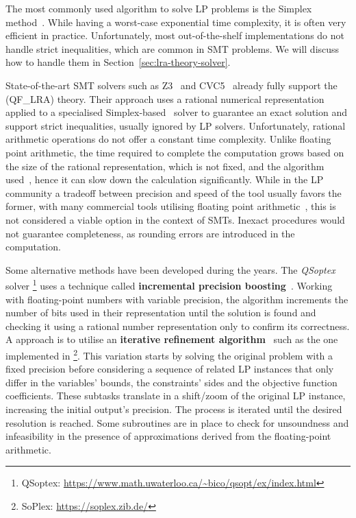 \documentclass[runningheads]{llncs}
\begin{document}
The most commonly used algorithm to solve LP problems is the Simplex method~\cite{ref:simplex}.
While having a worst-case exponential time complexity, it is often very efficient in practice.
Unfortunately, most out-of-the-shelf implementations do not handle strict inequalities, which are common in SMT problems.
We will discuss how to handle them in Section~\ref{sec:lra-theory-solver}.

State-of-the-art SMT solvers such as Z3~\cite{ref:z3} and CVC5~\cite{ref:cvc5} already fully support the (QF\_LRA) theory.
Their approach uses a rational numerical representation applied to a specialised Simplex-based~\cite{ref:simplex} solver to guarantee an exact solution and support strict inequalities, usually ignored by LP solvers.
Unfortunately, rational arithmetic operations do not offer a constant time complexity. %
Unlike floating point arithmetic, the time required to complete the computation grows based on the size of the rational representation, which is not fixed, and the algorithm used~\cite{ref:fft-mult}, hence it can slow down the calculation significantly.
While in the LP community a tradeoff between precision and speed of the tool usually favors the former, with many commercial tools utilising floating point arithmetic~\cite{ref:gurobi}, this is not considered a viable option in the context of SMTs.
Inexact procedures would not guarantee completeness, as rounding errors are introduced in the computation.

Some alternative methods have been developed during the years.
The \textit{QSoptex} solver \footnote{QSoptex: \url{https://www.math.uwaterloo.ca/~bico/qsopt/ex/index.html}} uses a technique called \textbf{incremental precision boosting}~\cite{ref:precision-boosting}.
Working with floating-point numbers with variable precision, the algorithm increments the number of bits used in their representation until the solution is found and checking it using a rational number representation only to confirm its correctness.
A approach is to utilise an \textbf{iterative refinement algorithm}~\cite{ref:iterative-refinement} such as the one implemented in \soplex \footnote{SoPlex: \url{https://soplex.zib.de/}}.
This variation starts by solving the original problem with a fixed precision before considering a sequence of related LP instances that only differ in the variables' bounds, the constraints' sides and the objective function coefficients.
These subtasks translate in a shift/zoom of the original LP instance, increasing the initial output's precision.
The process is iterated until the desired resolution is reached.
Some subroutines are in place to check for unsoundness and infeasibility in the presence of approximations derived from the floating-point arithmetic.
\end{document}
